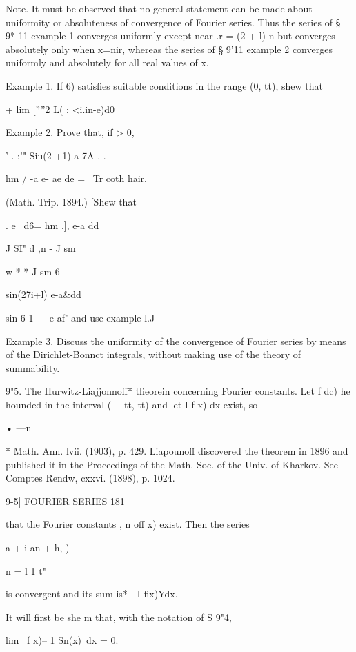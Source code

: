 Note. It must be observed that no general statement can be made about
uniformity or absoluteness of convergence of Fourier series. Thus the
series of § 9* 11 example 1 converges uniformly except near .r = (2 +
l) n but converges absolutely only when x=nir, whereas the series of §
9'11 example 2 converges uniformly and absolutely for all real values
of x.

Example 1. If 6) satisfies suitable conditions in the range (0, tt),
shew that

+ lim [''''2 L( : <i.in-e)d0

Example 2. Prove that, if > 0,

' . ;'" Siu(2 +1) a 7A . .

hm / -a e- ae de = \ Tr coth hair.

(Math. Trip. 1894.) [Shew that



  . e~ d6= hm .], e-a dd

J SI" d ,n - J sm



w-*-* J sm 6

  sin(27i+l) e-a\&dd



sin 6 1 — e-af' and use example l.J

Example 3. Discuss the uniformity of the convergence of Fourier series
by means of the Dirichlet-Bonnct integrals, without making use of the
theory of summability.

9"5. The Hurwitz-Liajjonnoff* tlieorein concerning Fourier constants.
Let f dc) he hounded in the interval (— tt, tt) and let I f x) dx
exist, so

• —n

* Math. Ann. lvii. (1903), p. 429. Liapounoff discovered the theorem
in 1896 and published it in the Proceedings of the Math. Soc. of the
Univ. of Kharkov. See Comptes Rendw, cxxvi. (1898), p. 1024.



9-5] FOURIER SERIES 181

that the Fourier constants , n off x) exist. Then the series

 a + i an + h, )

n = l 1 t"

is convergent and its sum is* - I fix)Ydx.

It will first be she m that, with the notation of S 9"4,



lim \ f x)-- 1 Sn(x)\ dx = 0.



